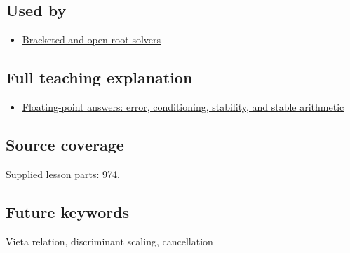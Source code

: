 \subsection{Used by}\label{used-by}

\begin{itemize}
\tightlist
\item
  \hyperref[appendix-f63eb850796d]{Bracketed and open root solvers}
\end{itemize}

\subsection{Full teaching explanation}\label{full-teaching-explanation}

\begin{itemize}
\tightlist
\item
  \href{Continuous\%20Notes/Computing\%20Foundations\%20-\%20From\%20Bits\%20to\%20C++\%20and\%20Systems\%20APIs\#Floating-point\%20answers:\%20error,\%20conditioning,\%20stability,\%20and\%20stable\%20arithmetic}{Floating-point answers: error, conditioning, stability, and stable arithmetic}
\end{itemize}

\subsection{Source coverage}\label{source-coverage}

Supplied lesson parts: 974.

\subsection{Future keywords}\label{future-keywords}

Vieta relation, discriminant scaling, cancellation
